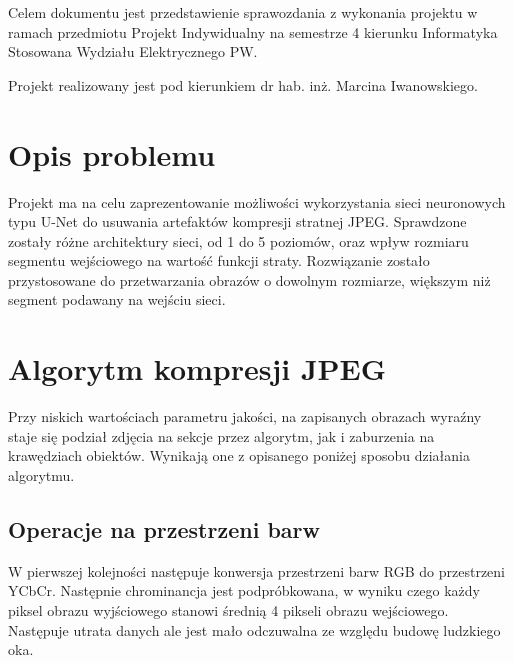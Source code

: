 \documentclass[a4paper, 12pt]{article}
\begin{document}
\maketitle
\thispagestyle{empty}
\newpage
\thispagestyle{empty}
Celem dokumentu jest przedstawienie sprawozdania z wykonania projektu w ramach przedmiotu Projekt Indywidualny na semestrze 4 kierunku Informatyka Stosowana Wydziału Elektrycznego PW.
\begin{center}
Projekt realizowany jest pod kierunkiem dr hab. inż. Marcina Iwanowskiego.
\end{center}
\thispagestyle{empty}
\newpage
\tableofcontents
\thispagestyle{empty}

\newpage
\section{Opis problemu}
\indent Projekt ma na celu zaprezentowanie możliwości wykorzystania sieci neuronowych typu U-Net do usuwania artefaktów kompresji stratnej JPEG.
Sprawdzone zostały różne architektury sieci, od 1 do 5 poziomów, oraz wpływ rozmiaru segmentu wejściowego na wartość funkcji straty.
Rozwiązanie zostało przystosowane do przetwarzania obrazów o dowolnym rozmiarze, większym niż segment podawany na wejściu sieci.
\section{Algorytm kompresji JPEG}
Przy niskich wartościach parametru jakości, na zapisanych obrazach wyraźny staje się podział zdjęcia na sekcje przez algorytm,
jak i zaburzenia na krawędziach obiektów. Wynikają one z opisanego poniżej sposobu działania algorytmu. \cite{JPEG}
\subsection{Operacje na przestrzeni barw}
W pierwszej kolejności następuje konwersja przestrzeni barw RGB do przestrzeni YCbCr.
Następnie chrominancja jest podpróbkowana, w wyniku czego każdy piksel obrazu wyjściowego stanowi średnią 4 pikseli obrazu wejściowego.
Następuje utrata danych ale jest mało odczuwalna ze względu budowę ludzkiego oka.
\end{document}
